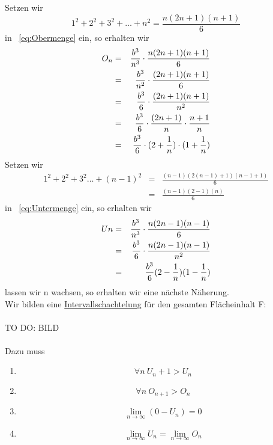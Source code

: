 \documentclass[a4paper,10pt]{report}
\begin{document}
Setzen wir 
\begin{equation*}1^2+2^2+3^2+\ldots+n^2= \frac{n(2n+1)(n+1)}{6}\end{equation*}
in ~\ref{eq:Obermenge} ein, so erhalten wir
\begin{eqnarray}
	O_n &=& \frac{b^3}{n^3} \cdot \frac{n(2n+1)(n+1)}{6} \notag\\
	&=& \frac{b^3}{n^2} \cdot \frac{(2n+1)(n+1)}{6}\notag\\
	&=&\frac{b^3}{6} \cdot \frac{(2n+1)(n+1)}{n^2}\notag\\
	&=& \frac{b^3}{6}\cdot\frac{(2n+1)}{n}\cdot\frac{n+1}{n}\notag\\
	&=& \frac{b^3}{6}\cdot (2+\frac{1}{n})\cdot(1+\frac{1}{n}) \label{eq:Obermenge2}
\end{eqnarray}
Setzen wir
\begin{eqnarray*}
	1^2+2^2+3^2\ldots+(n-1)^2 &=& \frac{(n-1)(2(n-1)+1)(n-1+1)}{6}\\
	&=& \frac{(n-1)(2-1)(n)}{6}
\end{eqnarray*}
in  ~\ref{eq:Untermenge} ein, so erhalten wir
\begin{eqnarray}
	Un &=& \frac{b^3}{n^3}\cdot\frac{n(2n-1)(n-1)}{6} \notag\\
	&=& \frac{b^3}{6}\cdot \frac{n(2n-1)(n-1)}{n^2} \notag\\
	&=& \frac{b^3}{6}(2-\frac{1}{n})(1-\frac{1}{n}) \label{eq:Untermenge2}
\end{eqnarray}
lassen wir n wachsen, so erhalten wir eine nächste Näherung.\\
Wir bilden eine \underline{Intervallschachtelung} für den gesamten Flächeinhalt F:\\
\\
TO DO: BILD\\
\\
Dazu muss
\begin{enumerate}
	\item
		\begin{equation*}\forall n \> U_n+1 > U_n\end{equation*}
	\item
		\begin{equation*}\forall n\> O_{n+1} > O_n\end{equation*}
	\item
		\begin{equation*}\lim_{n\to \infty}(0-U_n) =0\end{equation*}
	\item
		\begin{equation*}\lim_{n\to \infty} U_n = \lim_{n\to\infty}O_n\end{equation*}
\end{enumerate}
\end{document}
